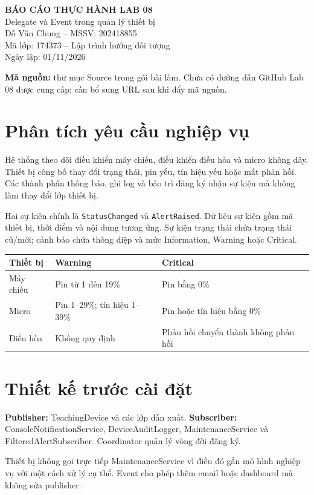 \documentclass[11pt,a4paper]{article}
\begin{document}
\begin{center}
{\Large\bfseries BÁO CÁO THỰC HÀNH LAB 08}\\[5pt]
{\large Delegate và Event trong quản lý thiết bị}\\[10pt]
Đỗ Văn Chung -- MSSV: 202418855\\
Mã lớp: 174373 -- Lập trình hướng đối tượng\\
Ngày lập: 01/11/2026
\end{center}
\textbf{Mã nguồn:} thư mục Source trong gói bài làm. Chưa có đường dẫn GitHub Lab 08 được cung cấp; cần bổ sung URL sau khi đẩy mã nguồn.
\section{Phân tích yêu cầu nghiệp vụ}
Hệ thống theo dõi điều khiển máy chiếu, điều khiển điều hòa và micro không dây. Thiết bị công bố thay đổi trạng thái, pin yếu, tín hiệu yếu hoặc mất phản hồi. Các thành phần thông báo, ghi log và bảo trì đăng ký nhận sự kiện mà không làm thay đổi lớp thiết bị.

Hai sự kiện chính là \texttt{StatusChanged} và \texttt{AlertRaised}. Dữ liệu sự kiện gồm mã thiết bị, thời điểm và nội dung tương ứng. Sự kiện trạng thái chứa trạng thái cũ/mới; cảnh báo chứa thông điệp và mức Information, Warning hoặc Critical.

\begin{tabularx}{\linewidth}{@{}p{3.4cm}XX@{}}\toprule
Thiết bị & Warning & Critical\\\midrule
Máy chiếu & Pin từ 1 đến 19\% & Pin bằng 0\%\\
Micro & Pin 1--29\%; tín hiệu 1--39\% & Pin hoặc tín hiệu bằng 0\%\\
Điều hòa & Không quy định & Phản hồi chuyển thành không phản hồi\\\bottomrule
\end{tabularx}
\section{Thiết kế trước cài đặt}
\textbf{Publisher:} TeachingDevice và các lớp dẫn xuất. \textbf{Subscriber:} ConsoleNotificationService, DeviceAuditLogger, MaintenanceService và FilteredAlertSubscriber. Coordinator quản lý vòng đời đăng ký.

Thiết bị không gọi trực tiếp MaintenanceService vì điều đó gắn mô hình nghiệp vụ với một cách xử lý cụ thể. Event cho phép thêm email hoặc dashboard mà không sửa publisher.
\end{document}
